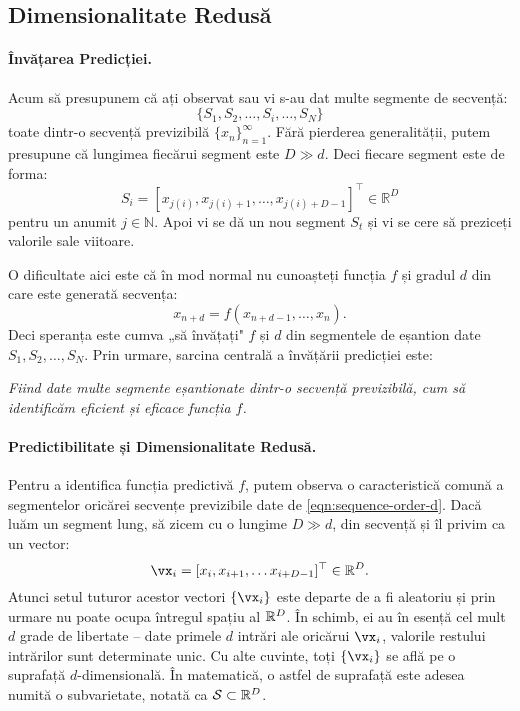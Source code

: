 \documentclass[../../book-main_ro.tex]{subfiles}
\begin{document}
\subsection{Dimensionalitate Redusă}\label{sec:intro-low-dimensionality}
\paragraph{Învățarea Predicției.}
Acum să presupunem că ați observat sau vi s-au dat multe segmente de secvență:
\begin{equation}
    \{S_1, S_2, \ldots, S_i, \ldots, S_N\}
\end{equation}
toate dintr-o secvență previzibilă $\{x_n\}_{n=1}^\infty$. Fără pierderea generalității, putem presupune că lungimea fiecărui segment este $D \gg d$. Deci fiecare segment este de forma:
\begin{equation}
    S_i = [x_{j(i)}, x_{j(i)+1}, \ldots, x_{j(i)+D-1}]^\top \in \mathbb{R}^D
\end{equation}
pentru un anumit $j \in \mathbb{N}$. Apoi vi se dă un nou segment $S_t$ și vi se cere să preziceți valorile sale viitoare.

O dificultate aici este că în mod normal nu cunoașteți funcția $f$ și gradul $d$ din care este generată secvența:
\begin{equation}
    x_{n+d} = f(x_{n+d-1}, \ldots,  x_{n}).
\label{eqn:sequence-order-d}
\end{equation}
Deci speranța este cumva „să învățați" $f$ și $d$ din segmentele de eșantion date $S_1, S_2, \ldots, S_N$. Prin urmare, sarcina centrală a învățării predicției este:
\begin{center}
{\em Fiind date multe segmente eșantionate dintr-o secvență previzibilă, cum să identificăm eficient și eficace funcția $f$.}
\end{center}

\paragraph{Predictibilitate și Dimensionalitate Redusă.}
Pentru a identifica funcția predictivă $f$, putem observa o caracteristică comună a segmentelor oricărei secvențe previzibile date de \eqref{eqn:sequence-order-d}. Dacă luăm un segment lung, să zicem cu o lungime $D \gg d$, din secvență și îl privim ca un vector:
\begin{equation}
    \vx_i = [x_i, x_{i+1}, \ldots x_{i+D-1}]^\top \in \mathbb{R}^D.
\end{equation}
Atunci setul tuturor acestor vectori $\{\vx_i\}$ este departe de a fi aleatoriu și prin urmare nu poate ocupa întregul spațiu al $\mathbb{R}^D$. În schimb, ei au în esență cel mult $d$ grade de libertate -- date primele $d$ intrări ale oricărui $\vx_i$, valorile restului intrărilor sunt determinate unic. Cu alte cuvinte, toți $\{\vx_i\}$ se află pe o suprafață $d$-dimensională. În matematică, o astfel de suprafață este adesea numită o subvarietate, notată ca $\mathcal{S} \subset \mathbb{R}^D$.
\end{document}
